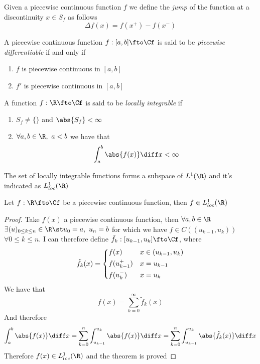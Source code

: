 \documentclass[../mmf.tex]{subfiles}
\begin{document}
\begin{dfn}[Jump]
	Given a piecewise continuous function $f$ we define the \textit{jump} of the function at a discontinuity $x\in S_f$ as follows
	\begin{equation*}
		\Delta f(x)=f(x^+)-f(x^-)
	\end{equation*}
\end{dfn}
\begin{dfn}
	A piecewise continuous function $f:[a,b]\fto\Cf$ is said to be \textit{piecewise differentiable} if and only if
	\begin{enumerate}
	\item $f$ is piecewise continuous in $[a,b]$
	\item $f'$ is piecewise continuous in $[a,b]$
	\end{enumerate}
\end{dfn}
\begin{dfn}
	A function $f:\R\fto\Cf$ is said to be \textit{locally integrable} if
	\begin{enumerate}
	\item $S_f\ne\{\}$ and $\abs{S_f}<\infty$
	\item $\forall a,b\in\R,\ a<b$ we have that
		\begin{equation*}
			\int_{a}^{b}\abs{f(x)}\diff x<\infty
		\end{equation*}
	\end{enumerate}
	The set of locally integrable functions forms a subspace of $L^1(\R)$ and it's indicated as $L^1_{loc}(\R)$
\end{dfn}
\begin{thm}
	Let $f:\R\fto\Cf$ be a piecewise continuous function, then $f\in L^1_{loc}(\R)$
\end{thm}
\begin{proof}
	Take $f(x)$ a piecewise continuous function, then $\forall a,b\in\R$ $\exists(u)_{0\le k\le n}\in\R\st u_0=a,\ u_n=b$ for which we have $f\in C( (u_{k-1},u_k) )$ $\forall 0\le k\le n$. I can therefore define $\tilde{f}_k:[u_{k-1},u_k]\fto\Cf$, where
	\begin{equation*}
		\tilde{f}_k(x)=\begin{dcases}
			f(x)&x\in(u_{k-1},u_k)\\
			f(u_{k-1}^+)&x=u_{k-1}\\
			f(u_k^-)&x=u_k
		\end{dcases}
	\end{equation*}
	We have that
	\begin{equation*}
		f(x)=\sum_{k=0}^\infty\tilde{f}_k(x)
	\end{equation*}
	And therefore
	\begin{equation*}
		\int_{a}^{b}\abs{f(x)}\diff x=\sum_{k=0}^n\int_{u_{k-1}}^{u_k}\abs{f(x)}\diff x=\sum_{k=0}^n\int_{u_{k-1}}^{u_k}\abs{\tilde{f}_k(x)}\diff x
	\end{equation*}
	Therefore $f(x)\in L^1_{loc}(\R)$ and the theorem is proved
\end{proof}
\end{document}
